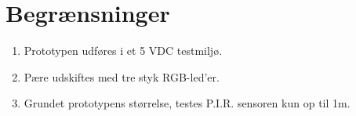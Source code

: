 \section{Begrænsninger}

\begin{enumerate}
	\item Prototypen udføres i et 5 VDC testmiljø.
	\item Pære udskiftes med tre styk RGB-led'er.
	\item Grundet prototypens størrelse, testes P.I.R. sensoren kun op til 1m.
\end{enumerate}